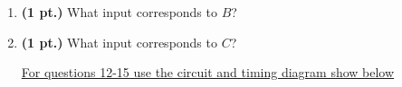 \documentclass{article}
\begin{document}
\begin{enumerate}
\item {\bf (1 pt.)} What input corresponds to $B$?

\item {\bf (1 pt.)} What input corresponds to $C$?

\pagebreak
\underline{For questions 12-15 use the circuit and timing diagram
show below}


\end{enumerate}
\end{document}
